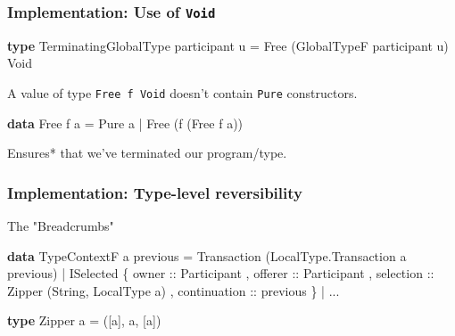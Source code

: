 \documentclass[12pt]{beamer}
\newenvironment{Shaded}{}{}
\newcommand{\KeywordTok}[1]{\textcolor[rgb]{0.00,0.44,0.13}{\textbf{#1}}}
\newcommand{\DataTypeTok}[1]{\textcolor[rgb]{0.56,0.13,0.00}{#1}}
\newcommand{\OtherTok}[1]{\textcolor[rgb]{0.00,0.44,0.13}{#1}}
\newcommand{\FunctionTok}[1]{\textcolor[rgb]{0.02,0.16,0.49}{#1}}
\newcommand{\NormalTok}[1]{#1}
\begin{document}
\begin{frame}[fragile]
\frametitle{Implementation: Use of \texttt{Void}}

\begin{Shaded}
\begin{Highlighting}[]
\KeywordTok{type} \DataTypeTok{TerminatingGlobalType}\NormalTok{ participant u }\FunctionTok{=} 
    \DataTypeTok{Free}\NormalTok{ (}\DataTypeTok{GlobalTypeF}\NormalTok{ participant u) }\DataTypeTok{Void}
\end{Highlighting}
\end{Shaded}

A value of type \texttt{Free f Void} doesn't contain \texttt{Pure} constructors.

\begin{Shaded}
\begin{Highlighting}[]
\KeywordTok{data} \DataTypeTok{Free}\NormalTok{ f a }
    \FunctionTok{=} \DataTypeTok{Pure}\NormalTok{ a }
    \FunctionTok{|} \DataTypeTok{Free}\NormalTok{ (f (}\DataTypeTok{Free}\NormalTok{ f a))}
\end{Highlighting}
\end{Shaded}

Ensures* that we've terminated our program/type. 

\end{frame}


\begin{frame}[fragile]
\frametitle{Implementation: Type-level reversibility}
    The "Breadcrumbs"

\begin{Shaded}
\begin{Highlighting}[]
\KeywordTok{data} \DataTypeTok{TypeContextF}\NormalTok{ a previous }
    \FunctionTok{=} \DataTypeTok{Transaction}\NormalTok{ (}\DataTypeTok{LocalType.Transaction}\NormalTok{ a previous)}
    \FunctionTok{|} \DataTypeTok{ISelected} 
\NormalTok{        \{}\OtherTok{ owner ::} \DataTypeTok{Participant}
\NormalTok{        ,}\OtherTok{ offerer ::} \DataTypeTok{Participant} 
\NormalTok{        ,}\OtherTok{ selection ::} \DataTypeTok{Zipper}\NormalTok{ (}\DataTypeTok{String}\NormalTok{, }\DataTypeTok{LocalType}\NormalTok{ a)}
\NormalTok{        ,}\OtherTok{ continuation ::}\NormalTok{ previous }
\NormalTok{        \}}
    \FunctionTok{|} \FunctionTok{...}

\KeywordTok{type} \DataTypeTok{Zipper}\NormalTok{ a }\FunctionTok{=} 
\NormalTok{    ([a], a, [a])}
\end{Highlighting}
\end{Shaded}

\end{frame}
\end{document}

